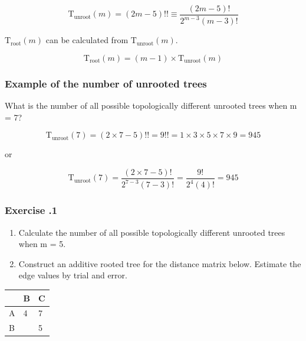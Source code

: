 \[
\mathrm{T_{unroot}}(m) = (2m - 5)!! \equiv \dfrac{(2m-5)!}{2^{m-3}(m-3)!}
\]
\medskip

\noindent
$\mathrm{T_{root}}(m)$ can be calculated from $\mathrm{T_{unroot}}(m)$. 

\[
\mathrm{T_{root}}(m) = (m-1) \times \mathrm{T_{unroot}}(m)
\]

%
%
\subsubsection*{Example of the number of unrooted trees}
What is the number of all possible topologically different unrooted trees when m = 7?

\[
\mathrm{T_{unroot}}(7) = (2 \times 7 - 5)!! = 9!! =1 \times 3 \times 5 \times 7 \times9 = 945
\]

or

\[
\mathrm{T_{unroot}}(7) = \dfrac{(2 \times 7 - 5)!}{2^{7-3}(7-3)!} = \dfrac{9!}{2^{4}(4)!} = 945
\]

%
%
\subsubsection*{Exercise \thesection.1}
\begin{enumerate}
\item Calculate the number of all possible topologically different unrooted trees when m = 5.
\medskip 

\item Construct an additive rooted tree for the distance matrix below. Estimate the edge values by trial and error.
\end{enumerate}

\begin{table}[H]
\centering
\begin{tabular}{|l|l|l|}
\hline
  & B & C \\ \hline
A & 4 & 7 \\ \hline
B &   & 5 \\ \hline
\end{tabular}
\end{table}

\bigskip 

%
